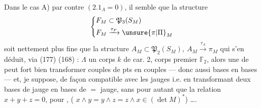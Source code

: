 Dans le cas A) par contre $(2.1_\Lambda=0)$,
il semble que la structure 
\[
 \left\{\begin{aligned}F_M&\subset\mathfrak P_3(S_M)\\ F_M&\xrightarrow{\tau_F}\unsure{\pi|\Pi}_M\end{aligned}\right.
\]
soit nettement plus fine que la structure $A_M\subset\mathfrak P_2(S_M),\ A_M\xrightarrow{\tau_A}\pi_M$ qui s'en déduit, via (177) (168) :
$\Lambda$ un corps $k$ de car. 2, \deleted{\unsure{$\ne$}} corps premier $\mathbb F_2$, alors une  de  peut fort bien transformer couples de pts    en couples  --- donc aussi bases en bases --- et, je suppose, de façon compatible avec les jauges i.e. en transformant  deux bases de  jauge en   bases de $=$ jauge, sans pour autant que  la relation $x+y+z=0$, pour , ( $x\wedge y=y\wedge z=z\wedge x\in(\det M)^*$) \ldots.

